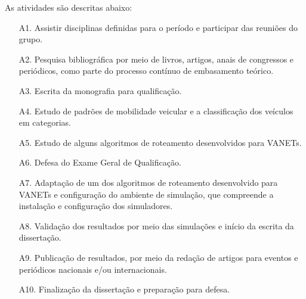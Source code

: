 \documentclass[mestrado, pre-defesa, english, brazil]{packages/icmc}
\begin{document}
As atividades são descritas abaixo:
\begin{enumerate}
	\item[A1.] Assistir disciplinas definidas para o período e participar das reuniões do grupo.
	\item[A2.] Pesquisa bibliográfica por meio de livros, artigos, anais de congressos e periódicos, como parte do processo contínuo de embasamento teórico.
	\item[A3.] Escrita da monografia para qualificação.
	\item[A4.] Estudo de padrões de mobilidade veicular e a classificação dos veículos em categorias.
	\item[A5.] Estudo de alguns algoritmos de roteamento desenvolvidos para VANETs.
	\item[A6.] Defesa do Exame Geral de Qualificação.
	\item[A7.] Adaptação de um dos algoritmos de roteamento desenvolvido para VANETs e configuração do ambiente de simulação, que compreende a instalação e configuração dos simuladores.
	\item[A8.] Validação dos resultados por meio das simulações e início da escrita da dissertação.
	\item[A9.] Publicação de resultados, por meio da redação de artigos para eventos e periódicos nacionais e/ou internacionais.
	\item[A10.] Finalização da dissertação e preparação para defesa.
\end{enumerate}



\end{document}

